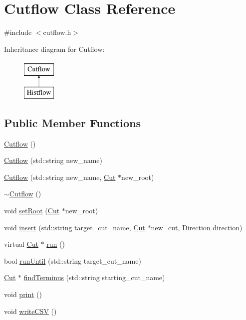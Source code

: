 \hypertarget{classCutflow}{}\section{Cutflow Class Reference}
\label{classCutflow}


{\ttfamily \#include $<$cutflow.\+h$>$}

Inheritance diagram for Cutflow\+:\begin{figure}[H]
\begin{center}
\leavevmode
\includegraphics[height=2.000000cm]{classCutflow}
\end{center}
\end{figure}
\subsection*{Public Member Functions}
\begin{DoxyCompactItemize}
\item 
\hyperlink{classCutflow_a17811cb40a7906fc65e79ce69e3b21be}{Cutflow} ()
\item 
\hyperlink{classCutflow_a46b6444272c54fe9988e8d328d0644ca}{Cutflow} (std\+::string new\+\_\+name)
\item 
\hyperlink{classCutflow_ae13ef13d8c6cef09bed242855e45aacf}{Cutflow} (std\+::string new\+\_\+name, \hyperlink{classCut}{Cut} $\ast$new\+\_\+root)
\item 
\hyperlink{classCutflow_adb300cd78d57a287934e4d22856a0ffe}{$\sim$\+Cutflow} ()
\item 
void \hyperlink{classCutflow_ad27d37141c3748779a5d81fad919ecbb}{set\+Root} (\hyperlink{classCut}{Cut} $\ast$new\+\_\+root)
\item 
void \hyperlink{classCutflow_a8da46f1053a6b97991489ee0920c29a1}{insert} (std\+::string target\+\_\+cut\+\_\+name, \hyperlink{classCut}{Cut} $\ast$new\+\_\+cut, Direction direction)
\item 
virtual \hyperlink{classCut}{Cut} $\ast$ \hyperlink{classCutflow_a563da4fc41aa5c611dd0ce37ce966f2c}{run} ()
\item 
bool \hyperlink{classCutflow_a3b5a6dc6e9490037d190eca691295859}{run\+Until} (std\+::string target\+\_\+cut\+\_\+name)
\item 
\hyperlink{classCut}{Cut} $\ast$ \hyperlink{classCutflow_a11c1116dc01d4c0679945eeff66ff0a4}{find\+Terminus} (std\+::string starting\+\_\+cut\+\_\+name)
\item 
void \hyperlink{classCutflow_a0cb4c8bd6d15ace1f85fe0cfb8d9d828}{print} ()
\item 
void \hyperlink{classCutflow_a56105cb7e5bccd7f9f6ed3b6d79ad753}{write\+C\+SV} ()
\end{DoxyCompactItemize}
